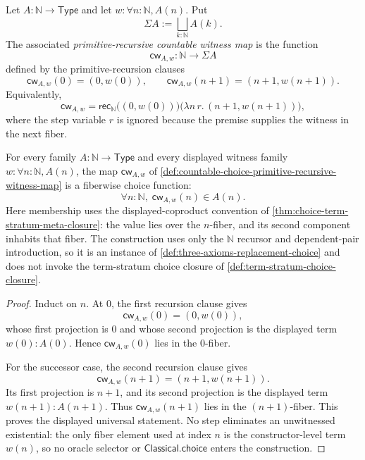 \begin{definition}
\label{def:countable-choice-primitive-recursive-witness-map}
Let $A:\mathbb{N}\to\mathsf{Type}$ and let $w:\forall n:\mathbb{N},A(n)$. Put
$$
\Sigma A:=\bigsqcup_{k:\mathbb{N}}A(k).
$$
The associated \emph{primitive-recursive countable witness map} is the function
$$
\mathsf{cw}_{A,w}:\mathbb{N}\to\Sigma A
$$
defined by the primitive-recursion clauses
$$
\mathsf{cw}_{A,w}(0)=(0,w(0)),\qquad
\mathsf{cw}_{A,w}(n+1)=(n+1,w(n+1)).
$$
Equivalently,
$$
\mathsf{cw}_{A,w}
=
\mathsf{rec}_{\mathbb{N}}
\bigl((0,w(0))\bigr)
\bigl(\lambda n\,r.\,(n+1,w(n+1))\bigr),
$$
where the step variable $r$ is ignored because the premise supplies the witness in the next fiber.
\end{definition}

\begin{theorem}
\label{thm:countable-choice-primitive-recursive-witness-function}
For every family $A:\mathbb{N}\to\mathsf{Type}$ and every displayed witness family $w:\forall n:\mathbb{N},A(n)$, the map $\mathsf{cw}_{A,w}$ of \autoref{def:countable-choice-primitive-recursive-witness-map} is a fiberwise choice function:
$$
\forall n:\mathbb{N},\;\mathsf{cw}_{A,w}(n)\in A(n).
$$
Here membership uses the displayed-coproduct convention of \autoref{thm:choice-term-stratum-meta-closure}: the value lies over the $n$-fiber, and its second component inhabits that fiber. The construction uses only the $\mathbb{N}$ recursor and dependent-pair introduction, so it is an instance of \autoref{def:three-axioms-replacement-choice} and does not invoke the term-stratum choice closure of \autoref{def:term-stratum-choice-closure}.
\end{theorem}

\begin{proof}
Induct on $n$. At $0$, the first recursion clause gives
$$
\mathsf{cw}_{A,w}(0)=(0,w(0)),
$$
whose first projection is $0$ and whose second projection is the displayed term $w(0):A(0)$. Hence $\mathsf{cw}_{A,w}(0)$ lies in the $0$-fiber.

For the successor case, the second recursion clause gives
$$
\mathsf{cw}_{A,w}(n+1)=(n+1,w(n+1)).
$$
Its first projection is $n+1$, and its second projection is the displayed term $w(n+1):A(n+1)$. Thus $\mathsf{cw}_{A,w}(n+1)$ lies in the $(n+1)$-fiber. This proves the displayed universal statement. No step eliminates an unwitnessed existential: the only fiber element used at index $n$ is the constructor-level term $w(n)$, so no oracle selector or $\mathsf{Classical.choice}$ enters the construction.
\end{proof}

